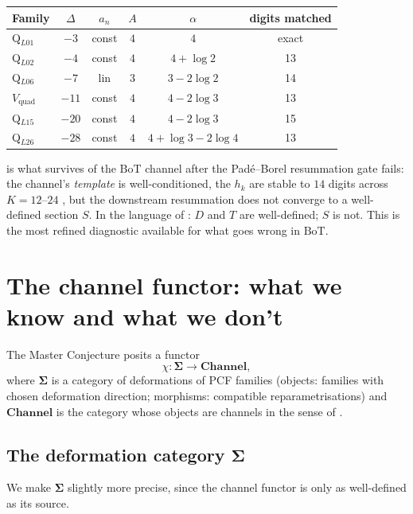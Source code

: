 \documentclass[11pt,reqno]{amsart}
\theoremstyle{plain}
\theoremstyle{definition}
\theoremstyle{remark}
\newcommand{\Channel}{\mathbf{Channel}}
\newcommand{\Sigmaspace}{\mathbf{\Sigma}}
\newcommand{\BoT}{\mathrm{BoT}}
\newcommand{\Vquad}{V_{\mathrm{quad}}}
\begin{document}
\begin{center}
\renewcommand{\arraystretch}{1.2}
\begin{tabular}{lccccc}
\hline
Family & $\Delta$ & $a_n$ & $A$ & $\alpha$ &
  digits matched \\
\hline
Q$_{L01}$ & $-3$  & const & $4$ & $4$              & exact \\
Q$_{L02}$ & $-4$  & const & $4$ & $4 + \log 2$     & 13 \\
Q$_{L06}$ & $-7$  & lin   & $3$ & $3 - 2\log 2$    & 14 \\
$\Vquad$  & $-11$ & const & $4$ & $4 - 2\log 3$    & 13 \\
Q$_{L15}$ & $-20$ & const & $4$ & $4 - 2\log 3$    & 15 \\
Q$_{L26}$ & $-28$ & const & $4$ & $4 + \log 3 - 2\log 4$ & 13 \\
\hline
\end{tabular}
\end{center}

 is what survives of the $\BoT$ channel after
the Pad\'e--Borel resummation gate fails: the channel's
\emph{template} is well-conditioned, the $h_k$ are stable to
$14$ digits across $K=12$--$24$ \cite{siarc_borel_kscan},
but the downstream resummation does not converge to a
well-defined section $S$. In the language of
: $D$ and $T$ are well-defined; $S$ is
not. This is the most refined diagnostic available for
what goes wrong in $\BoT$.

\section{The channel functor: what we know and what we don't}
\label{sec:functor}

The Master Conjecture \cite{siarc_umbrella} posits a functor
\[
  \chi : \Sigmaspace \longrightarrow \Channel,
\]
where $\Sigmaspace$ is a category of deformations of PCF
families (objects: families with chosen deformation direction;
morphisms: compatible reparametrisations) and $\Channel$ is
the category whose objects are channels in the sense of
.

\subsection{The deformation category $\Sigmaspace$}
\label{ssec:sigma}

We make $\Sigmaspace$ slightly more precise, since the
channel functor is only as well-defined as its source.
\end{document}
